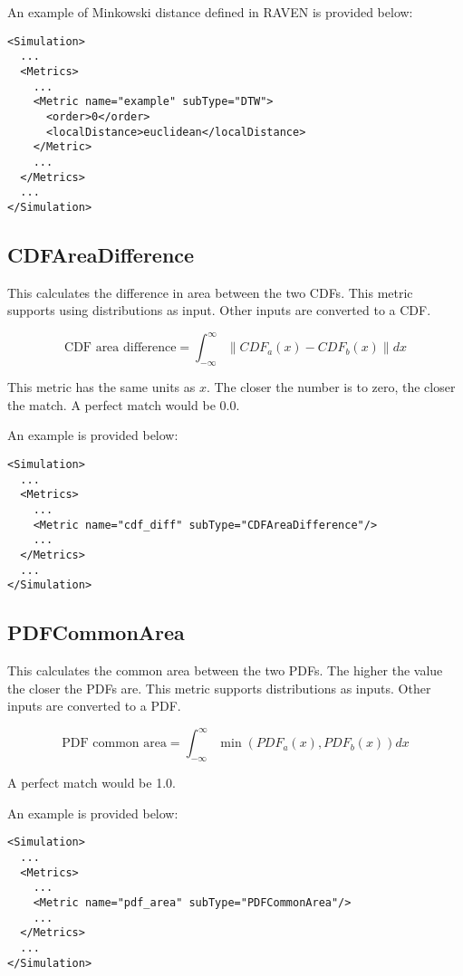 An example of Minkowski distance defined in RAVEN is provided below:
\begin{lstlisting}[style=XML]
<Simulation>
  ...
  <Metrics>
    ...
    <Metric name="example" subType="DTW">
      <order>0</order>
      <localDistance>euclidean</localDistance>
    </Metric>
    ...
  </Metrics>
  ...
</Simulation>
\end{lstlisting}

\subsection{CDFAreaDifference}
\label{subsubsec:metric_CDFAreaDifference}
This calculates the difference in area between the two CDFs.  This
metric supports using distributions as input.  Other inputs are
converted to a CDF.

\begin{equation}
  \text{CDF area difference} = \int_{-\infty}^{\infty}{\|CDF_a(x)-CDF_b(x)\|dx}
\end{equation}

This metric has the same units as $x$.  The closer the number is
to zero, the closer the match.  A perfect match would be 0.0.

An example is provided below:
\begin{lstlisting}[style=XML]
<Simulation>
  ...
  <Metrics>
    ...
    <Metric name="cdf_diff" subType="CDFAreaDifference"/>
    ...
  </Metrics>
  ...
</Simulation>
\end{lstlisting}

\subsection{PDFCommonArea}
\label{subsubsec:metric_PDFCommonArea}
This calculates the common area between the two PDFs.  The higher the
value the closer the PDFs are.  This metric supports distributions as
inputs.  Other inputs are converted to a PDF.

\begin{equation}
  \text{PDF common area} = \int_{-\infty}^{\infty}{\min(PDF_a(x),PDF_b(x))}dx
\end{equation}

A perfect match would be 1.0.


An example is provided below:
\begin{lstlisting}[style=XML]
<Simulation>
  ...
  <Metrics>
    ...
    <Metric name="pdf_area" subType="PDFCommonArea"/>
    ...
  </Metrics>
  ...
</Simulation>
\end{lstlisting}

